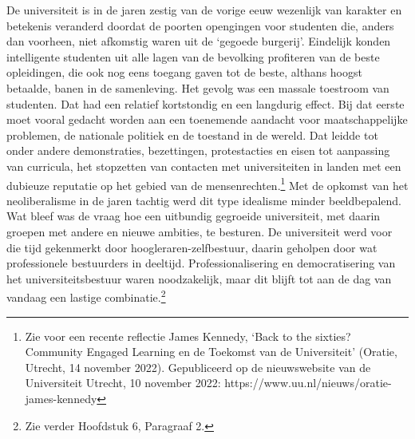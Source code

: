 \documentclass[smallauthor, chapterhaspagenum, nochapterinheader, pagenuminheader,  bigchapnum,medium2, tocpages,  garamond, titleinheader]{jote-book}
\begin{document}
	De universiteit is in de jaren zestig van de vorige eeuw wezenlijk van karakter en betekenis veranderd doordat de poorten opengingen voor studenten die, anders dan voorheen, niet afkomstig waren uit de ‘gegoede burgerij'. Eindelijk konden intelligente studenten uit alle lagen van de bevolking profiteren van de beste opleidingen, die ook nog eens toegang gaven tot de beste, althans hoogst betaalde, banen in de samenleving. Het gevolg was een massale toestroom van studenten. Dat had een relatief kortstondig en een langdurig effect. Bij dat eerste moet vooral gedacht worden aan een toenemende aandacht voor maatschappelijke problemen, de nationale politiek en de toestand in de wereld. Dat leidde tot onder andere demonstraties, bezettingen, protestacties en eisen tot aanpassing van curricula, het stopzetten van contacten met universiteiten in landen met een dubieuze reputatie op het gebied van de mensenrechten.\footnote{Zie voor een recente reflectie James Kennedy, ‘Back to the sixties? Community Engaged Learning en de Toekomst van de Universiteit' (Oratie, Utrecht, 14 november 2022). Gepubliceerd op de nieuwswebsite van de Universiteit Utrecht, 10 november 2022: https://www.uu.nl/nieuws/oratie-james-kennedy } Met de opkomst van het neoliberalisme in de jaren tachtig werd dit type idealisme minder beeldbepalend. Wat bleef was de vraag hoe een uitbundig gegroeide universiteit, met daarin groepen met andere en nieuwe ambities, te besturen. De universiteit werd voor die tijd gekenmerkt door hoogleraren-zelfbestuur, daarin geholpen door wat professionele bestuurders in deeltijd. Professionalisering en democratisering van het universiteitsbestuur waren noodzakelijk, maar dit blijft tot aan de dag van vandaag een lastige combinatie.\footnote{Zie verder Hoofdstuk 6, Paragraaf 2.}
\end{document}
